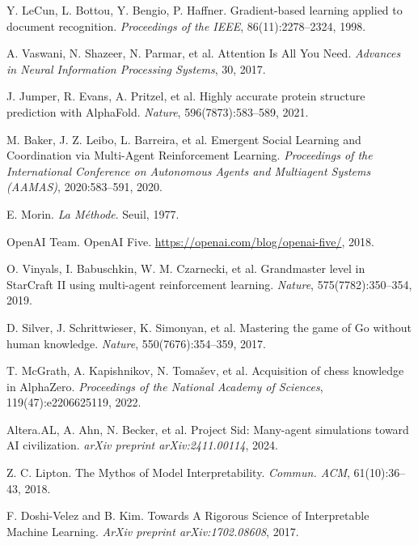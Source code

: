 \documentclass[11pt]{article}
\begin{document}
\begin{thebibliography}{9}

Y. LeCun, L. Bottou, Y. Bengio, P. Haffner.
\newblock Gradient-based learning applied to document recognition.
\newblock \emph{Proceedings of the IEEE}, 86(11):2278--2324, 1998.

A. Vaswani, N. Shazeer, N. Parmar, et al.
\newblock Attention Is All You Need.
\newblock \emph{Advances in Neural Information Processing Systems}, 30, 2017.

J. Jumper, R. Evans, A. Pritzel, et al.
\newblock Highly accurate protein structure prediction with AlphaFold.
\newblock \emph{Nature}, 596(7873):583--589, 2021.

M. Baker, J. Z. Leibo, L. Barreira, et al.
\newblock Emergent Social Learning and Coordination via Multi-Agent Reinforcement Learning.
\newblock \emph{Proceedings of the International Conference on Autonomous Agents and Multiagent Systems (AAMAS)}, 2020:583--591, 2020.

E. Morin.
\newblock \emph{La Méthode}.
\newblock Seuil, 1977.

OpenAI Team.
\newblock OpenAI Five.
\newblock \url{https://openai.com/blog/openai-five/}, 2018.

O. Vinyals, I. Babuschkin, W. M. Czarnecki, et al.
\newblock Grandmaster level in StarCraft II using multi-agent reinforcement learning.
\newblock \emph{Nature}, 575(7782):350--354, 2019.

D. Silver, J. Schrittwieser, K. Simonyan, et al.
\newblock Mastering the game of Go without human knowledge.
\newblock \emph{Nature}, 550(7676):354--359, 2017.

T. McGrath, A. Kapishnikov, N. Tomašev, et al.
\newblock Acquisition of chess knowledge in AlphaZero.
\newblock \emph{Proceedings of the National Academy of Sciences}, 119(47):e2206625119, 2022.

Altera.AL, A. Ahn, N. Becker, et al.
\newblock Project Sid: Many-agent simulations toward AI civilization.
\newblock \emph{arXiv preprint arXiv:2411.00114}, 2024.

Z. C. Lipton.
\newblock The Mythos of Model Interpretability.
\newblock \emph{Commun. ACM}, 61(10):36--43, 2018.

F. Doshi-Velez and B. Kim.
\newblock Towards A Rigorous Science of Interpretable Machine Learning.
\newblock \emph{ArXiv preprint arXiv:1702.08608}, 2017.


\end{thebibliography}
\end{document}
